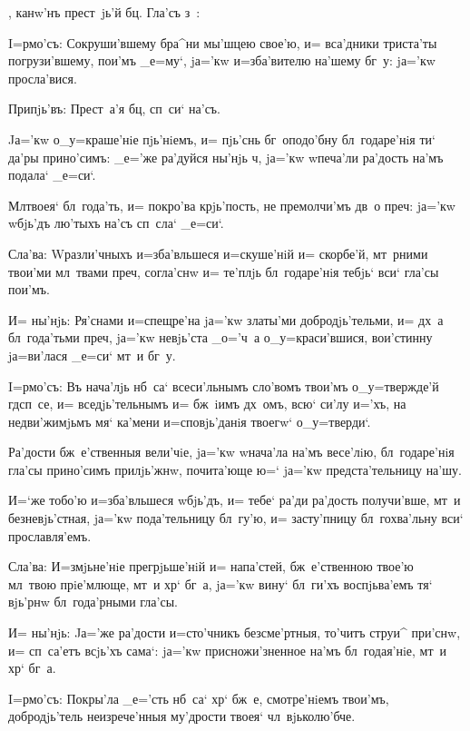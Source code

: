 , канw'нъ прест~jь'й бц. 
Гла'съ з~:


I=рмо'съ: Сокруши'вшему бра^ни мы'шцею свое'ю, и= 
вса'дники триста'ты погрузи'вшему, пои'мъ _е=му`, jа='кw 
и=зба'вителю на'шему бг~у: jа='кw просла'вися.

Припjь'въ: Прест~а'я бц, сп~си` на'съ.

Jа='кw о_у=краше'нiе пjь'нiемъ, и= пjь'снь 
бг~оподо'бну бл~годаре'нiя ти` да'ры прино'симъ: _е='же 
ра'дуйся ны'нjь ч, jа='кw w\т печа'ли ра'дость на'мъ 
подала` _е=си`.

Мл твоея` бл~года'ть, и= покро'ва крjь'пость, не 
премолчи'мъ дв~о преч: jа='кw w\т бjь'дъ лю'тыхъ 
на'съ сп~сла` _е=си`.

Сла'ва: W\т разли'чныхъ и=зба'вльшеся и=скуше'нiй и= 
скорбе'й, мт~рними твои'ми мл~твами преч, согла'снw 
и= те'плjь бл~годаре'нiя тебjь` вси` гла'сы пои'мъ.

И= ны'нjь: Ря'снами и=спещре'на jа='кw златы'ми 
добродjь'тельми, и= дх~а бл~года'тьми преч, jа='кw 
невjь'ста _о='ч~а о_у=краси'вшися, вои'стинну jа=ви'лася 
_е=си` мт~и бг~у.


I=рмо'съ: Въ нача'лjь нб~са` всеси'льнымъ сло'вомъ 
твои'мъ о_у=твержде'й гд сп~се, и= вседjь'тельнымъ и= 
бж~iимъ дх~омъ, всю` си'лу и='хъ, на недви'жимjьмъ мя` 
ка'мени и=сповjь'данiя твоегw` о_у=тверди`.

Ра'дости бж~е'ственныя вели'чiе, jа='кw w\т нача'ла 
на'мъ весе'лiю, бл~годаре'нiя гла'сы прино'симъ 
прилjь'жнw, почита'юще ю=` jа='кw предста'тельницу на'шу.

И=`же тобо'ю и=зба'вльшеся w\т бjь'дъ, и= тебе` ра'ди 
ра'дость получи'вше, мт~и безневjь'стная, jа='кw 
пода'тельницу бл~гу'ю, и= засту'пницу бл~гохва'льну вси` 
прославля'емъ.

Сла'ва: И=змjьне'нiе прегрjьше'нiй и= напа'стей, 
бж~е'ственною твое'ю мл~твою прiе'млюще, мт~и хр` 
бг~а, jа='кw вину` бл~ги'хъ воспjьва'емъ тя` вjь'рнw 
бл~года'рными гла'сы.

И= ны'нjь: Jа='же ра'дости и=сто'чникъ безсме'ртныя, 
то'читъ струи^ при'снw, и= сп~са'етъ всjь'хъ сама`: 
jа='кw присножи'зненное на'мъ бл~годая'нiе, мт~и хр` 
бг~а.


I=рмо'съ: Покры'ла _е='сть нб~са` хр` бж~е, 
смотре'нiемъ твои'мъ, добродjь'тель неизрече'нныя 
му'дрости твоея` чл~вjьколю'бче.

